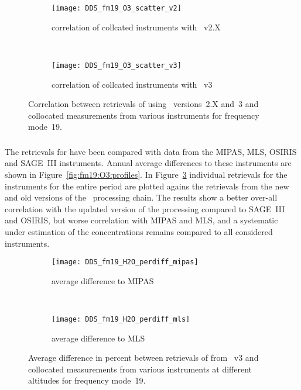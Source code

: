 \begin{figure}[htpb]
    \centering
    \begin{subfigure}[b]{0.49\textwidth}
        \texttt{[image: DDS\_fm19\_O3\_scatter\_v2]}
        \caption{correlation of collcated instruments with \smr~v2.X}
        \label{fig:fm19:O3:scatter:v2}
    \end{subfigure}
    \,
    \begin{subfigure}[b]{0.49\textwidth}
        \texttt{[image: DDS\_fm19\_O3\_scatter\_v3]}
        \caption{correlation of collcated instruments with \smr~v3}
        \label{fig:fm19:O3:scatter:v3}
    \end{subfigure}
    \caption{Correlation between retrievals of  using \smr\
    versions~2.X and~3 and collocated measurements from various instruments
    for frequency mode~19.}
    \label{fig:fm19:O3:scatter}
\end{figure}

\subsubsection{}
\label{sec:fm19:comparison:O3}
The retrievals for \chem{O_3} have been compared with data from the MIPAS, MLS,
OSIRIS and SAGE~III instruments. Annual average differences to these
instruments are shown in Figure~\ref{fig:fm19:O3:profiles}. In
Figure~\ref{fig:fm19:O3:scatter} individual retrievals for the instruments for
the entire period are plotted agains the retrievals from the new and old
versions of the \smr\ processing chain. The results show a better over-all
correlation with the updated version of the processing compared to SAGE~III and
OSIRIS, but worse correlation with MIPAS and MLS, and a systematic under
estimation of the concentrations remains compared to all considered
instruments.



\begin{figure}[htpb]
    \centering
    \begin{subfigure}[b]{0.49\textwidth}
        \texttt{[image: DDS\_fm19\_H2O\_perdiff\_mipas]}
        \caption{average difference to MIPAS}
        \label{fig:fm19:H2O:profiles:MIPAS}
    \end{subfigure}
    \,
    \begin{subfigure}[b]{0.49\textwidth}
        \texttt{[image: DDS\_fm19\_H2O\_perdiff\_mls]}
        \caption{average difference to MLS}
        \label{fig:fm19:H2O:profiles:MLS}
    \end{subfigure}
    \caption{Average difference in percent between retrievals of 
    from \smr~v3 and collocated measurements from various instruments at
    different altitudes for frequency mode~19.}

    \label{fig:fm19:H2O:profiles}
\end{figure}

